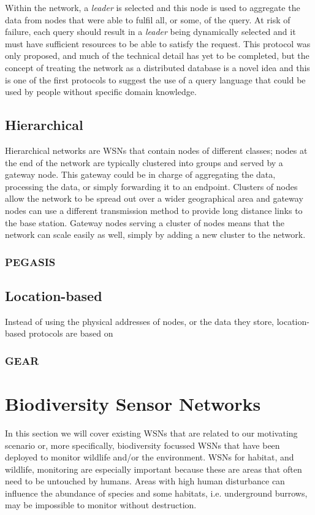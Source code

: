 Within the network, a \textit{leader} is selected and this node is used to aggregate the data from nodes that were able to fulfil all, or some, of the query. At risk of failure, each query should result in a \textit{leader} being dynamically selected and it must have sufficient resources to be able to satisfy the request. This protocol was only proposed, and much of the technical detail has yet to be completed, but the concept of treating the network as a distributed database is a novel idea and this is one of the first protocols to suggest the use of a query language that could be used by people without specific domain knowledge.

\subsection{Hierarchical}
	Hierarchical networks are WSNs that contain nodes of different classes; nodes at the end of the network are typically clustered into groups and served by a gateway node. This gateway could be in charge of aggregating the data, processing the data, or simply forwarding it to an endpoint. Clusters of nodes allow the network to be spread out over a wider geographical area and gateway nodes can use a different transmission method to provide long distance links to the base station. Gateway nodes serving a cluster of nodes means that the network can scale easily as well, simply by adding a new cluster to the network.

\subsubsection{PEGASIS}


\subsection{Location-based}
	Instead of using the physical addresses of nodes, or the data they store, location-based protocols are based on 

\subsubsection{GEAR}

\section{Biodiversity Sensor Networks}
	In this section we will cover existing WSNs that are related to our motivating scenario or, more specifically, biodiversity focussed WSNs that have been deployed to monitor wildlife and/or the environment. WSNs for habitat, and wildlife, monitoring are especially important because these are areas that often need to be untouched by humans. Areas with high human disturbance can influence the abundance of species and some habitats, i.e. underground burrows, may be impossible to monitor without destruction.


